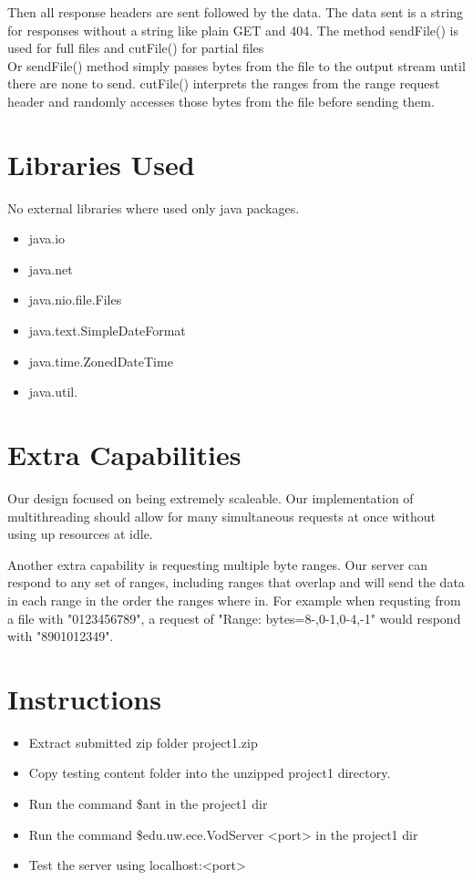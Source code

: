 \documentclass[11pt, letterpaper]{report}
\begin{document}
Then all response headers are sent followed by the data. The data sent is a string for responses without a string like plain GET and 404. The method sendFile() is used for full files and cutFile() for partial files \\

Or sendFile() method simply passes bytes from the file to the output stream until there are none to send. cutFile() interprets the ranges from the range request header and randomly accesses those bytes from the file before sending them.
\section{Libraries Used}
No external libraries where used only java packages.
\begin{itemize}
    \item java.io
    \item java.net
    \item java.nio.file.Files
    \item java.text.SimpleDateFormat
    \item java.time.ZonedDateTime
    \item java.util.
\end{itemize}

\section{Extra Capabilities}
Our design focused on being extremely scaleable. Our implementation of multithreading should allow for many simultaneous requests at once without using up resources at idle.

Another extra capability is requesting multiple byte ranges. Our server can respond to any set of ranges, including ranges that overlap and will send the data in each range in the order the ranges where in. For example when requsting from a file with "0123456789", a request of "Range: bytes=8-,0-1,0-4,-1" would respond with "8901012349".

\section{Instructions}
\begin{itemize}
    \item Extract submitted zip folder project1.zip

    \item Copy testing content folder into the unzipped project1 directory.
    
    \item Run the command \$ant in the project1 dir
    
    \item Run the command \$edu.uw.ece.VodServer <port> in the project1 dir
    
    \item Test the server using localhost:<port>
    
\end{itemize}
\end{document}

